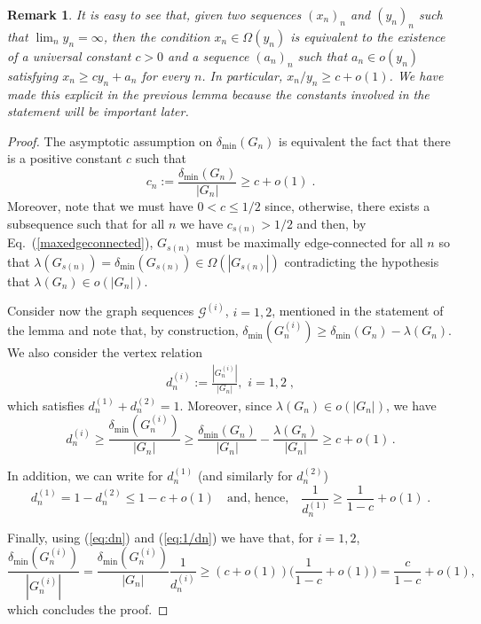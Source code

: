 \documentclass[a4paper,onecolumn,accepted=2024-12-14]{quantumarticle}
\newtheorem{remark}[theorem]{Remark}%
\theoremstyle{plain}
\newcommand{\cG}{{\mathcal G}}         %
\newcommand{\quadtext}[1]{\quad\text{#1}\quad}
\begin{document}
\begin{remark}
It is easy to see that, given two sequences $(x_n)_n$ and $(y_n)_n$ such that $\lim_n y_n=\infty$, then the condition $x_n\in\Omega (y_n)$ is equivalent to the existence of a universal constant $c>0$ and a sequence $(a_n)_n$ such that $a_n\in o(y_n)$ satisfying $x_n\geq cy_n+a_n$ for every $n$. In particular,
$x_n/y_n\geq c+ o(1)$. We have made this explicit in the previous lemma because the constants involved in the statement will be important later.
\end{remark}


\begin{proof}
The asymptotic assumption on $\delta_{\mathrm{min}}(G_n)$ is equivalent the fact that there is a positive constant $c$ such that
\begin{equation}\label{eq:cn}
c_n:=\frac{\delta_{\mathrm{min}}(G_n)}{|G_n|}\geq c+ o(1)\;.
\end{equation}
Moreover, note that we must have $0< c \leq 1/2$ since, otherwise, there exists a subsequence such that for all $n$ we have
$c_{s(n)} > 1/2$ and then, by Eq.~(\ref{maxedgeconnected}), $G_{s(n)}$
must be maximally edge-connected for all $n$ so that
$\lambda(G_{s(n)}) =\delta_{\mathrm{min}}(G_{s(n)})\in \Omega(|G_{s(n)}|)$ contradicting the hypothesis that $\lambda(G_n) \in o(|G_n|)$.

Consider now the graph sequences $\cG^{(i)}$, $i=1,2$, mentioned in the statement of the lemma and note that, by construction,
$\delta_{\mathrm{min}}\left(G_n^{(i)}\right)
\geq\delta_{\mathrm{min}}(G_n)-\lambda(G_n)$. We also consider the vertex relation
\begin{align}
 d_n^{(i)}:=\frac{|G_n^{(i)}|}{|G_n|}, \, \,  i=1,2\;,
 \end{align}
 which satisfies $d_n^{(1)}+d_n^{(2)}=1$. Moreover, since $\lambda(G_n)\in o(|G_n|)$, we have
\begin{equation}\label{eq:dn}
d_n^{(i)}\geq\frac{\delta_{\mathrm{min}}(G_n^{(i)})}{|G_n|}
         \geq  \frac{\delta_{\mathrm{min}}(G_n)}{|G_n|}-\frac{\lambda(G_n)}{|G_n|}\geq c+o(1)\,.
    \end{equation}

In addition, we can write for $d_n^{(1)}$ (and similarly for $d_n^{(2)}$)
 \begin{equation}\label{eq:1/dn}
 d_n^{(1)} =1- d_n^{(2)}\leq 1-c+o(1)\quadtext{and, hence,}
           \frac{1}{d_n^{(1)}}
           \geq \frac{1}{1-c}+o(1)\;.
 \end{equation}

Finally,  using (\ref{eq:dn}) and (\ref{eq:1/dn}) we have that, for $i=1,2$,
\begin{equation}
 \frac{\delta_{\mathrm{min}}(G_n^{(i)})}{|G_n^{(i)}|}=\frac{\delta_{\mathrm{min}}(G_n^{(i)})}{|G_n|}\frac{1}{d_n^{(i)}}\geq (c+o(1))\Big( \frac{1}{1-c}+o(1)\Big)=
 \frac{c}{1-c}+o(1),
\end{equation}
which concludes the proof.
\end{proof}
\end{document}
